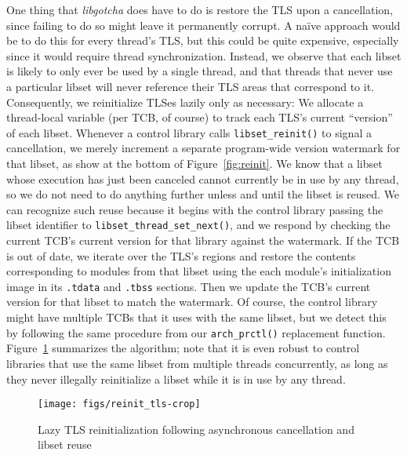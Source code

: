 One thing that \textit{libgotcha} does have to do is restore the TLS upon a
cancellation, since failing to do so might leave it permanently corrupt.  A na\"ive
approach would be to do this for every thread's TLS, but this could be quite
expensive, especially since it would require thread synchronization.  Instead, we
observe that each libset is likely to only ever be used by a single thread, and that
threads that never use a particular libset will never reference their TLS areas that
correspond to it.  Consequently, we reinitialize TLSes lazily only as necessary:
We allocate a thread-local variable (per TCB, of course) to track each TLS's current
``version'' of each libset.  Whenever a control library calls
\texttt{libset\_reinit()} to signal a cancellation, we merely increment a separate
program-wide version watermark for that libset, as show at the bottom of
Figure~\ref{fig:reinit}.  We know that a libset whose execution has just been
canceled cannot currently be in use by any thread, so we do not need to do anything
further unless and until the libset is reused.  We can recognize such reuse because
it begins with the control library passing the libset identifier to
\texttt{libset\_thread\_set\_next()}, and we respond by checking the current TCB's
current version for that library against the watermark.  If the TCB is out of date,
we iterate over the TLS's regions and restore the contents corresponding to modules
from that libset using the each module's initialization image in its \texttt{.tdata}
and \texttt{.tbss} sections.  Then we update the TCB's current version for that
libset to match the watermark.  Of course, the control library might have multiple
TCBs that it uses with the same libset, but we detect this by following the same
procedure from our \texttt{arch\_prctl()} replacement function.
Figure~\ref{fig:tlsreinit} summarizes the algorithm; note that it is even robust to
control libraries that use the same libset from multiple threads concurrently, as
long as they never illegally reinitialize a libset while it is in use by any thread.

\begin{figure}
\texttt{[image: figs/reinit\_tls-crop]}
\caption{Lazy TLS reinitialization following asynchronous cancellation and libset reuse}
\label{fig:tlsreinit}
\end{figure}

